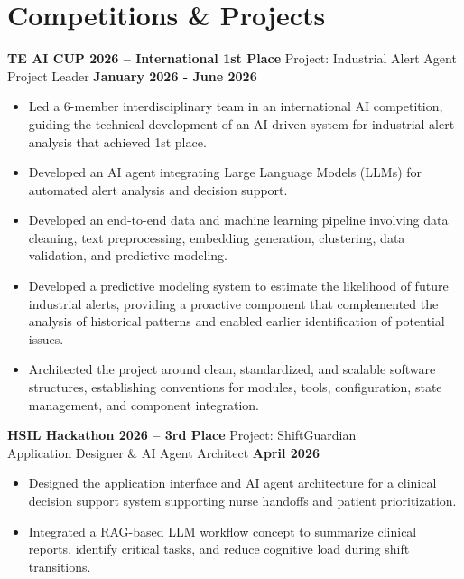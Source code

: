 \documentclass[11pt]{article}
\begin{document}
\section*{Competitions \& Projects}
\textbf{TE AI CUP 2026 -- International 1st Place} \hfill Project: Industrial Alert Agent\\
Project Leader \hfill \textbf{January 2026 - June 2026}
\vspace{-0.3cm}
\begin{itemize}[leftmargin=*]
    \item Led a 6-member interdisciplinary team in an international AI competition, guiding the technical development of an AI-driven system for industrial alert analysis that achieved 1st place. 

    \vspace{-0.3cm} 
    \item Developed an AI agent integrating Large Language Models (LLMs) for automated alert analysis and decision support.

    \vspace{-0.3cm} 
    \item Developed an end-to-end data and machine learning pipeline involving data cleaning, text preprocessing, embedding generation, clustering, data validation, and predictive modeling. 

    \vspace{-0.3cm}
    \item Developed a predictive modeling system to estimate the likelihood of future industrial alerts, providing a proactive component that complemented the analysis of historical patterns and enabled earlier identification of potential issues.

    \vspace{-0.3cm} 
    \item Architected the project around clean, standardized, and scalable software structures, establishing conventions for modules, tools, configuration, state management, and component integration. 
\end{itemize}



\textbf{HSIL Hackathon 2026 -- 3rd Place} \hfill Project: ShiftGuardian\\
Application Designer \& AI Agent Architect \hfill \textbf{April 2026}
\vspace{-0.3cm}
\begin{itemize}[leftmargin=*]
    \item Designed the application interface and AI agent architecture for a clinical decision support system supporting nurse handoffs and patient prioritization.
    
    \vspace{-0.3cm}
    \item Integrated a RAG-based LLM workflow concept to summarize clinical reports, identify critical tasks, and reduce cognitive load during shift transitions.
\end{itemize}
\end{document}
